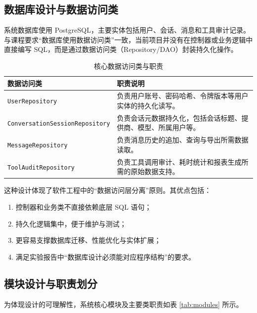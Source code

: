 \documentclass[12pt,a4paper,UTF8]{ctexart}
\begin{document}
\subsection{数据库设计与数据访问类}
系统数据库使用 PostgreSQL，主要实体包括用户、会话、消息和工具审计记录。与课程要求“数据库使用数据访问类”一致，当前项目并没有在控制器或业务逻辑中直接编写 SQL，而是通过数据访问类（Repository/DAO）封装持久化操作。

\begin{table}[H]
    \centering
    \caption{核心数据访问类与职责}
    \label{tab:data-access}
    \begin{tabular}{p{3.3cm}p{8cm}}
        \toprule
        数据访问类 & 职责说明 \\
        \midrule
        \texttt{UserRepository} & 负责用户账号、密码哈希、令牌版本等用户实体的持久化读写。 \\
        \texttt{ConversationSessionRepository} & 负责会话元数据持久化，包括会话标题、提供商、模型、所属用户等。 \\
        \texttt{MessageRepository} & 负责消息历史的追加、查询与导出所需数据读取。 \\
        \texttt{ToolAuditRepository} & 负责工具调用审计、耗时统计和报表生成所需的原始数据支持。 \\
        \bottomrule
    \end{tabular}
\end{table}

这种设计体现了软件工程中的“数据访问层分离”原则。其优点包括：
\begin{enumerate}
    \item 控制器和业务类不直接依赖底层 SQL 语句；
    \item 持久化逻辑集中，便于维护与测试；
    \item 更容易支撑数据库迁移、性能优化与实体扩展；
    \item 满足实验报告中“数据库设计必须能对应程序结构”的要求。
\end{enumerate}

\subsection{模块设计与职责划分}
为体现设计的可理解性，系统核心模块及主要类职责如表 \ref{tab:modules} 所示。
\end{document}
